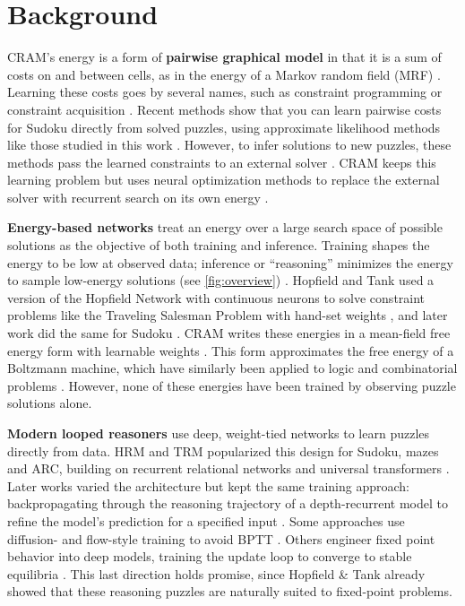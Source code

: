\documentclass{article}
\newcommand{\CRAM}{\textsc{CRAM}}
\begin{document}
%
\section{Background}
\label{sec:background}

\CRAM{}'s energy is a form of \textbf{pairwise graphical model} in that it is a sum of costs on and between cells, as in the energy of a Markov random field (MRF) \citep{besag1974,wainwright2008}.
Learning these costs goes by several names, such as constraint programming \citep{schiex1995vcsp} or constraint acquisition \citep{bessiere2017conacq,modelseeker2012,deraedt2018}. Recent methods show that you can learn pairwise costs for Sudoku directly from solved puzzles, using approximate likelihood methods like those studied in this work \citep{brouard2020,defresne2023,epll2025}. 
However, to infer solutions to new puzzles, these methods pass the learned constraints to an external solver \citep{cooper2010softarc}.
\CRAM{} keeps this learning problem but uses neural optimization methods to replace the external solver with recurrent search on its own energy \citep{hopfieldtank1985,petersonsoderberg1989}.

\textbf{Energy-based networks} treat an energy over a large search space of possible solutions as the objective of both training and inference. 
Training shapes the energy to be low at observed data; inference or ``reasoning'' minimizes the energy to sample low-energy solutions (see \cref{fig:overview}) \citep{hopfield1982,lecun2006energy}. 
%
%
Hopfield and Tank used a version of the Hopfield Network with continuous neurons to solve constraint problems like the Traveling Salesman Problem with hand-set weights \citep{hopfield1984,hopfieldtank1985}, and later work did the same for Sudoku \citep{hopfieldsudoku2008}.
\CRAM{} writes these energies in a mean-field free energy form with learnable weights \citep{petersonsoderberg1989}. 
This form approximates the free energy of a Boltzmann machine, which have similarly been applied to logic and combinatorial problems \citep{ackley1985,hinton1989dbm,danjou1993,tran2023lbm}.
However, none of these energies have been trained by observing puzzle solutions alone.

\textbf{Modern looped reasoners} use deep, weight-tied networks to learn puzzles directly from data.
HRM and TRM popularized this design for Sudoku, mazes and ARC, building on recurrent relational networks and universal transformers \citep{hrm2025,trm2025,chollet2019,rrn2018,universaltransformer2019}.
Later works varied the architecture but kept the same training approach: backpropagating through the reasoning trajectory of a depth-recurrent model to refine the model's prediction for a specified input \citep{urm2025,gram2026,ptrm2026,serrm2026,mgdm2025,adaptive2025,loopedflows2026,trmp2026}.
Some approaches use diffusion- and flow-style training to avoid BPTT \citep{ired2024,mgdm2025,adaptive2025,frm2026,fixedpointflows2026,loopedflows2026}.
Others engineer fixed point behavior into deep models, training the update loop to converge to stable equilibria \citep{eqr2026,fprm2026,frm2026,fixedpointflows2026,attractor2026}.
This last direction holds promise, since Hopfield \& Tank already showed that these reasoning puzzles are naturally suited to fixed-point problems.
\end{document}
